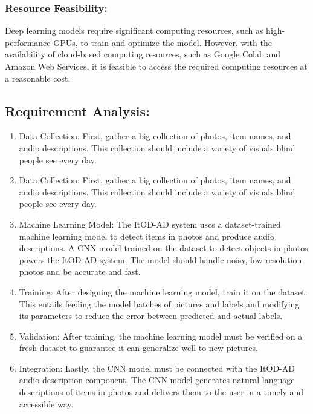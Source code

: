 \subsubsection{Resource Feasibility:}


Deep learning models require significant computing resources, such as high-performance GPUs, to train and optimize the model. However, with the availability of cloud-based computing resources, such as Google Colab and Amazon Web Services, it is feasible to access the required computing resources at a reasonable cost.


\subsection{Requirement Analysis: }
\begin{enumerate}

  \item Data Collection: First, gather a big collection of photos, item names, and audio descriptions. This collection should include a variety of visuals blind people see every day.

  \item Data Collection: First, gather a big collection of photos, item names, and audio descriptions. This collection should include a variety of visuals blind people see every day.

  \item Machine Learning Model: The ItOD-AD system uses a dataset-trained machine learning model to detect items in photos and produce audio descriptions. A CNN model trained on the dataset to detect objects in photos powers the ItOD-AD system. The model should handle noisy, low-resolution photos and be accurate and fast.
  
\item Training: After designing the machine learning model, train it on the dataset. This entails feeding the model batches of pictures and labels and modifying its parameters to reduce the error between predicted and actual labels.
\item Validation: After training, the machine learning model must be verified on a fresh dataset to guarantee it can generalize well to new pictures.
\item Integration: Lastly, the CNN model must be connected with the ItOD-AD audio description component. The CNN model generates natural language descriptions of items in photos and delivers them to the user in a timely and accessible way.



\end{enumerate}
